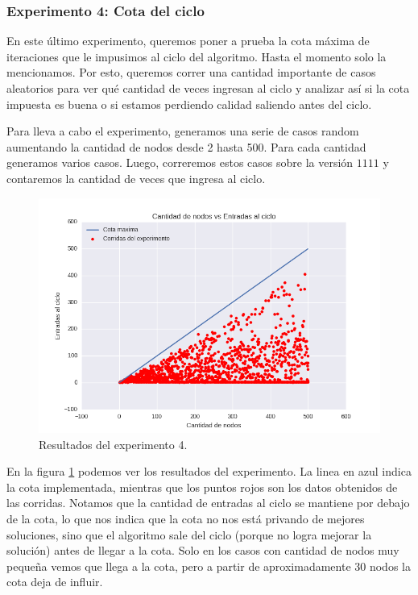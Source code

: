 \subsubsection{Experimento 4: Cota del ciclo}

\par En este último experimento, queremos poner a prueba la cota máxima de iteraciones que le impusimos al ciclo del algoritmo. Hasta el momento solo la mencionamos. Por esto, queremos correr una cantidad importante de casos aleatorios para ver qué cantidad de veces ingresan al ciclo y analizar así si la cota impuesta es buena o si estamos perdiendo calidad saliendo antes del ciclo.

\par Para lleva a cabo el experimento, generamos una serie de casos random aumentando la cantidad de nodos desde 2 hasta 500. Para cada cantidad generamos varios casos. Luego, correremos estos casos sobre la versión $1111$ y contaremos la cantidad de veces que ingresa al ciclo.

\begin{figure}[H]
  \begin{center}
    \includegraphics[width=\textwidth]{img/ejercicio3/exp4.png}
    \caption{Resultados del experimento 4.}
    \label{fig: ej3_exp4}
  \end{center}
\end{figure}

\par En la figura \ref{fig: ej3_exp4} podemos ver los resultados del experimento. La linea en azul indica la cota implementada, mientras que los puntos rojos son los datos obtenidos de las corridas. Notamos que la cantidad de entradas al ciclo se mantiene por debajo de la cota, lo que nos indica que la cota no nos está privando de mejores soluciones, sino que el algoritmo sale del ciclo (porque no logra mejorar la solución) antes de llegar a la cota. Solo en los casos con cantidad de nodos muy pequeña vemos que llega a la cota, pero a partir de aproximadamente 30 nodos la cota deja de influir.

